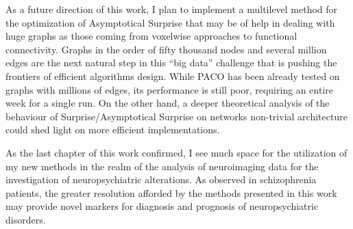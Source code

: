 As a future direction of this work, I plan to implement a multilevel method for the optimization of Asymptotical Surprise that may be of help in dealing with huge graphs as those coming from voxelwise approaches to functional connectivity.
Graphs in the order of fifty thousand nodes and several million edges are the next natural step in this ``big data'' challenge that is pushing the frontiers of efficient algorithms design.
While PACO has been already tested on graphs with millions of edges, its performance is still poor, requiring an entire week for a single run.
On the other hand, a deeper theoretical analysis of the behaviour of Surprise/Asymptotical Surprise on networks non-trivial architecture could shed light on more efficient implementations.

As the last chapter of this work confirmed, I see much space for the utilization of my new methods in the realm of the analysis of neuroimaging data for the investigation of neuropsychiatric alterations. As observed in schizophrenia patients, the greater resolution afforded by the methods presented in this work may provide novel markers for diagnosis and prognosis of neuropsychiatric disorders.
